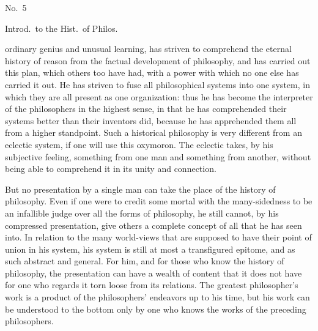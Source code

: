 \documentclass[12pt]{article}
\newcommand{\opage}[1]{\marginnote{\footnotesize\textit{[#1]}}}
\begin{document}
\begin{flushright}\opage{9r}No.\ 5\end{flushright}

\begin{center}Introd.\ to the Hist.\ of Philos.\end{center}

\noindent ordinary genius and unusual learning, has striven to comprehend the eternal history of reason from the factual development of philosophy, and has carried out this plan, which others too have had, with a power with which no one else has carried it out. He has striven to fuse all philosophical systems into one system, in which they are all present as one organization: thus he has become the interpreter of the philosophers in the highest sense, in that he has comprehended their systems better than their inventors did, because he has apprehended them all from a higher standpoint. Such a historical philosophy is very different from an eclectic system, if one will use this oxymoron. The eclectic takes, by his subjective feeling, something from one man and something from another, without being able to comprehend it in its unity and connection.

But no presentation by a single man can take the place of the history of philosophy. Even if one were to credit some mortal with the many-sidedness to be an infallible judge over all the forms of philosophy, he still cannot, by his compressed presentation, give others a complete concept of all that he has seen into. In relation to the many world-views that are supposed to have their point of union in his system, his system is still at most a transfigured epitome, and as such abstract and general. For him, and for those who know the history of philosophy, the presentation can have a wealth of content that it does not have for one who\opage{9v} regards it torn loose from its relations. The greatest philosopher's work is a product of the philosophers' endeavors up to his time, but his work can be understood to the bottom only by one who knows the works of the preceding philosophers.
\end{document}

